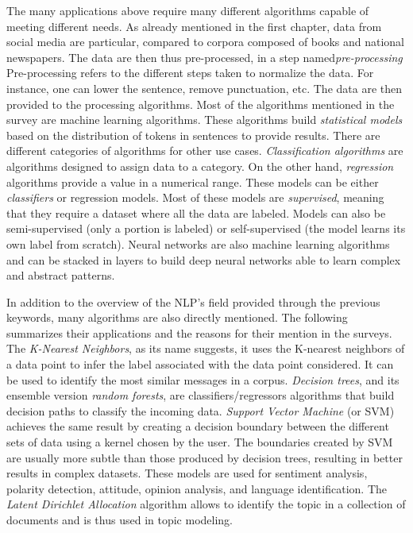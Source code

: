 The many applications above require many different algorithms capable of meeting different needs.
As already mentioned in the first chapter, data from social media are particular, compared to corpora composed of books and national newspapers.
The data are then thus pre-processed, in a step named\emph{pre-processing}
Pre-processing refers to the different steps taken to normalize the data.
For instance, one can lower the sentence, remove punctuation, etc.
The data are then provided to the processing algorithms.
Most of the algorithms mentioned in the survey are machine learning algorithms.
These algorithms build \emph{statistical models} based on the distribution of tokens in sentences to provide results.
There are different categories of algorithms for other use cases.
\emph{Classification algorithms} are algorithms designed to assign data to a category.
On the other hand, \emph{regression} algorithms provide a value in a numerical range.
These models can be either \emph{classifiers} or regression models.
Most of these models are \emph{supervised}, meaning that they require a dataset where all the data are labeled.
Models can also be semi-supervised (only a portion is labeled) or self-supervised (the model learns its own label from scratch).
Neural networks are also machine learning algorithms and can be stacked in layers to build deep neural networks able to learn complex and abstract patterns.

In addition to the overview of the NLP's field provided through the previous keywords, many algorithms are also directly mentioned.
The following summarizes their applications and the reasons for their mention in the surveys.
The \emph{K-Nearest Neighbors}, as its name suggests, it uses the K-nearest neighbors of a data point to infer the label associated with the data point considered.
It can be used to identify the most similar messages in a corpus.
\emph{Decision trees}, and its ensemble version \emph{random forests}, are classifiers/regressors algorithms that build decision paths to classify the incoming data.
\emph{Support Vector Machine} (or SVM) achieves the same result by creating a decision boundary between the different sets of data using a kernel chosen by the user.
The boundaries created by SVM are usually more subtle than those produced by decision trees, resulting in better results in complex datasets.
These models are used for sentiment analysis, polarity detection, attitude, opinion analysis, and language identification.
The \emph{Latent Dirichlet Allocation} algorithm allows to identify the topic in a collection of documents and is thus used in topic modeling.


